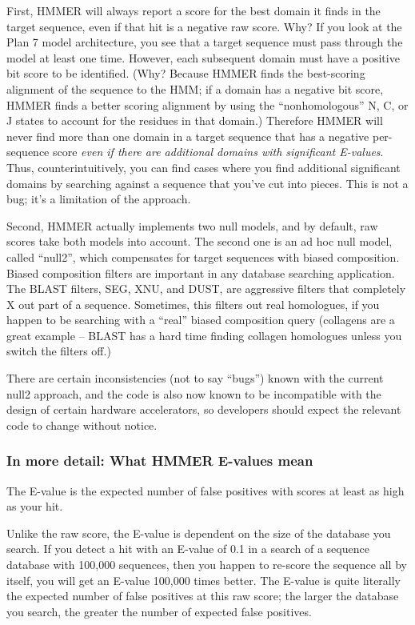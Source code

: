 First, HMMER will always report a score for the best domain it finds
in the target sequence, even if that hit is a negative raw score. Why?
If you look at the Plan 7 model architecture, you see that a target
sequence must pass through the model at least one time. However, each
subsequent domain must have a positive bit score to be identified.
(Why? Because HMMER finds the best-scoring alignment of the sequence
to the HMM; if a domain has a negative bit score, HMMER finds a better
scoring alignment by using the ``nonhomologous'' N, C, or J states to
account for the residues in that domain.) Therefore HMMER will never
find more than one domain in a target sequence that has a negative
per-sequence score \textit{even if there are additional domains with
significant E-values}. Thus, counterintuitively, you can find cases
where you find additional significant domains by searching against a
sequence that you've cut into pieces. This is not a bug; it's a
limitation of the approach.

Second, HMMER actually implements two null models, and by default, raw
scores take both models into account. The second one is an ad hoc null
model, called ``null2'', which compensates for target sequences with
biased composition. Biased composition filters are important in any
database searching application. The BLAST filters, SEG, XNU, and DUST,
are aggressive filters that completely X out part of a
sequence. Sometimes, this filters out real homologues, if you happen
to be searching with a ``real'' biased composition query (collagens
are a great example -- BLAST has a hard time finding collagen
homologues unless you switch the filters off.) 

There are certain inconsistencies (not to say ``bugs'') known with the
current null2 approach, and the code is also now known to be
incompatible with the design of certain hardware accelerators, so
developers should expect the relevant code to change without notice.

\subsubsection{In more detail: What HMMER E-values mean}

The E-value is the expected number of false positives with scores at
least as high as your hit.

Unlike the raw score, the E-value is dependent on the size of the
database you search. If you detect a hit with an E-value of 0.1 in a
search of a sequence database with 100,000 sequences, then you happen
to re-score the sequence all by itself, you will get an E-value
100,000 times better. The E-value is quite literally the expected
number of false positives at this raw score; the larger the database
you search, the greater the number of expected false positives.

